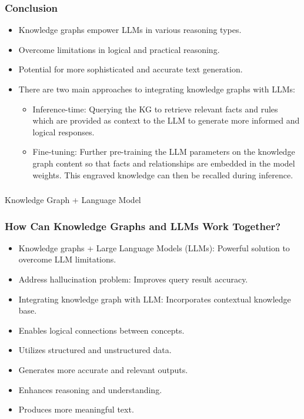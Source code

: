 \begin{frame}[fragile]
\frametitle{Conclusion}
\begin{itemize}
    \item Knowledge graphs empower LLMs in various reasoning types.
    \item Overcome limitations in logical and practical reasoning.
    \item Potential for more sophisticated and accurate text generation.
	\item There are two main approaches to integrating knowledge graphs with LLMs:
		\begin{itemize}
			\item Inference-time: Querying the KG to retrieve relevant facts and rules which are provided as context to the LLM to generate more informed and logical responses.
			\item Fine-tuning: Further pre-training the LLM parameters on the knowledge graph content so that facts and relationships are embedded in the model weights. This engraved knowledge can then be recalled during inference.
		\end{itemize}	
\end{itemize}
\end{frame}




\begin{frame}[fragile]\frametitle{}
\begin{center}
{\Large Knowledge Graph + Language Model}

\end{center}
\end{frame}


\begin{frame}[fragile]\frametitle{How Can Knowledge Graphs and LLMs Work Together?}

\begin{itemize}
\item Knowledge graphs + Large Language Models (LLMs): Powerful solution to overcome LLM limitations.
\item Address hallucination problem: Improves query result accuracy.
\item Integrating knowledge graph with LLM: Incorporates contextual knowledge base.
\item Enables logical connections between concepts.
\item Utilizes structured and unstructured data.
\item Generates more accurate and relevant outputs.
\item Enhances reasoning and understanding.
\item Produces more meaningful text.
\end{itemize}

\end{frame}

